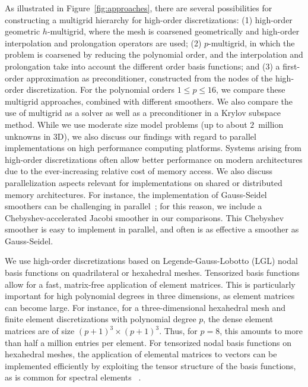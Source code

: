 \documentclass[times]{nlaauth}
\newcommand{\todo}[1]{\textcolor{red}{ #1}}
\begin{document}
As illustrated in Figure~\ref{fig:approaches}, there are several
possibilities for constructing a multigrid hierarchy for high-order
discretizations: (1) high-order geometric $h$-multigrid, where the
mesh is coarsened geometrically and high-order interpolation and
prolongation operators are used; (2) $p$-multigrid, in which the
problem is coarsened by reducing the polynomial order, and the
interpolation and prolongation take into account the different order
basis functions; and (3) a first-order approximation as
preconditioner, constructed from the nodes of the high-order
discretization.
For the polynomial orders $1\le p\le 16$, we
compare these multigrid approaches, combined with different
smoothers. We also compare the use of multigrid as a solver as well as a preconditioner
in a Krylov subspace method.  While we use moderate size model
problems (up to about $2$~million unknowns in 3D), we also discuss our findings with regard to parallel
implementations on high performance computing platforms. 
Systems arising from high-order discretizations often allow better performance on 
modern architectures due to the ever-increasing relative cost of memory access.
We also discuss parallelization aspects relevant for implementations on
shared or distributed memory architectures. For instance, the
implementation of Gauss-Seidel smoothers can be challenging in
parallel~\cite{AdamsBrezinaHuEtAl03, BakerFalgoutKolevEtAl11}; for
this reason, we include a Chebyshev-accelerated Jacobi smoother in our
comparisons. This Chebyshev smoother is easy to implement in parallel,
and often is as effective a smoother as Gauss-Seidel.


We use high-order discretizations based on Legende-Gauss-Lobotto
(LGL) nodal basis functions on quadrilateral or hexahedral
meshes. Tensorized basis functions allow for a fast, matrix-free
application of element matrices. This is particularly important for
high polynomial degrees in three dimensions, as element matrices
can become large. For instance, for a three-dimensional hexahedral mesh
and finite element discretizations with polynomial degree $p$, the
dense element
matrices are of size $(p+1)^3\times (p+1)^3$. Thus, for $p=8$, this
amounts to more than half a million entries per element.  For
tensorized nodal basis functions on hexahedral meshes, the application
of elemental matrices to vectors can be implemented efficiently by
exploiting the tensor structure of the basis functions, as is common
for spectral elements ~\cite{DevilleFischerMund02}.
\end{document}
